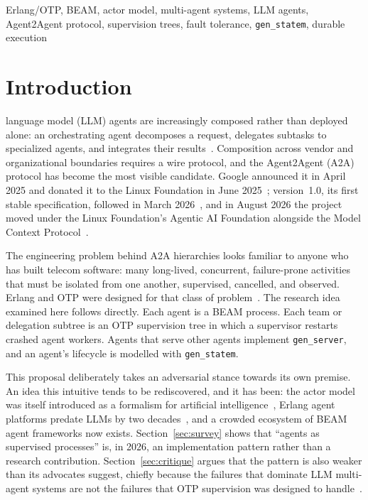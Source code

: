 \documentclass[conference,letterpaper]{IEEEtran}
\newcommand{\code}[1]{\texttt{#1}}
\newcommand{\gs}{\code{gen\_server}}
\newcommand{\gsm}{\code{gen\_statem}}
\begin{document}
\begin{IEEEkeywords}
Erlang/OTP, BEAM, actor model, multi-agent systems, LLM agents,
Agent2Agent protocol, supervision trees, fault tolerance, \gsm{},
durable execution
\end{IEEEkeywords}

\section{Introduction}

 language model (LLM) agents are increasingly
composed rather than deployed alone: an orchestrating agent decomposes a
request, delegates subtasks to specialized agents, and integrates their
results~\cite{anthropic2025,adk-multi}. Composition across vendor and
organizational boundaries requires a wire protocol, and the Agent2Agent
(A2A) protocol has become the most visible candidate. Google announced it in
April 2025 and donated it to the Linux Foundation in June
2025~\cite{lf2025}; version~1.0, its first stable specification, followed in
March 2026~\cite{lf2026}, and in
August 2026 the project moved under the Linux Foundation's Agentic AI
Foundation alongside the Model Context Protocol~\cite{axios2026}.

The engineering problem behind A2A hierarchies looks familiar to anyone who
has built telecom software: many long-lived, concurrent, failure-prone
activities that must be isolated from one another, supervised, cancelled,
and observed. Erlang and OTP were designed for that class of
problem~\cite{armstrong2003,armstrong2007}. The research idea examined here
follows directly. Each agent is a BEAM process. Each team or delegation
subtree is an OTP supervision tree in which a supervisor restarts crashed
agent workers. Agents that serve other agents implement \gs, and an agent's
lifecycle is modelled with \gsm.

This proposal deliberately takes an adversarial stance towards its own
premise. An idea this intuitive tends to be rediscovered, and it has been:
the actor model was itself introduced as a formalism for artificial
intelligence~\cite{hewitt1973}, Erlang agent platforms predate LLMs by two
decades~\cite{distefano2003,fernandez2013}, and a crowded ecosystem of BEAM
agent frameworks now exists. Section~\ref{sec:survey} shows that
``agents as supervised processes'' is, in 2026, an implementation pattern
rather than a research contribution. Section~\ref{sec:critique} argues that
the pattern is also weaker than its advocates suggest, chiefly because the
failures that dominate LLM multi-agent systems are not the failures that OTP
supervision was designed to handle~\cite{cemri2025}.
\end{document}
